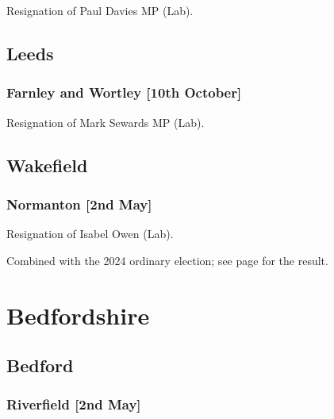 \documentclass[a4paper,openany]{book}
\begin{document}
\begin{resultsiii}

Resignation of Paul Davies MP (Lab).

\subsection*{Leeds}

\subsubsection*{Farnley and Wortley \hspace*{\fill}\nolinebreak[1]%
	\enspace\hspace*{\fill}
	[10th October]}


Resignation of Mark Sewards MP (Lab).

\subsection*{Wakefield}

\subsubsection*{Normanton \hspace*{\fill}\nolinebreak[1]%
	\enspace\hspace*{\fill}
	[2nd May]}


Resignation of Isabel Owen (Lab).

Combined with the 2024 ordinary election; see page \pageref{NormantonWakefield} for the result.

\section{Bedfordshire}

\subsection*{Bedford}

\subsubsection*{Riverfield \hspace*{\fill}\nolinebreak[1]%
	\enspace\hspace*{\fill}
	[2nd May]}


\end{resultsiii}
\end{document}
